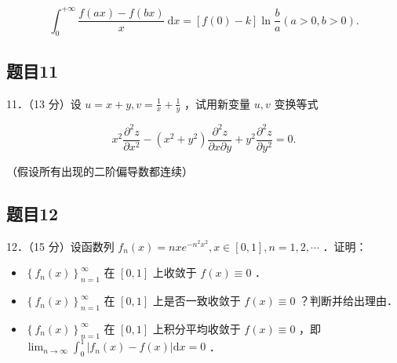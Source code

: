 \documentclass{article}
\begin{document}
\[
\int_{0}^{+\infty} \frac{f(a x)-f(b x)}{x} \mathrm{~d} x=[f(0)-k] \ln \frac{b}{a}(a>0, b>0) .
\]

\subsection{题目11}
11．（13 分）设 \(u=x+y, v=\frac{1}{x}+\frac{1}{y}\) ，试用新变量 \(u, v\) 变换等式

\[
x^{2} \frac{\partial^{2} z}{\partial x^{2}}-\left(x^{2}+y^{2}\right) \frac{\partial^{2} z}{\partial x \partial y}+y^{2} \frac{\partial^{2} z}{\partial y^{2}}=0 .
\]

（假设所有出现的二阶偏导数都连续）\\

\subsection{题目12}
12．（15 分）设函数列 \(f_{n}(x)=n x e^{-n^{2} x^{2}}, x \in[0,1], n=1,2, \cdots\) ．证明：

\begin{itemize}
  \item[（1）] \(\left\{f_{n}(x)\right\}_{n=1}^{\infty}\) 在 \([0,1]\) 上收敛于 \(f(x) \equiv 0\) ．
  \item[（2）] \(\left\{f_{n}(x)\right\}_{n=1}^{\infty}\) 在 \([0,1]\) 上是否一致收敛于 \(f(x) \equiv 0\) ？判断并给出理由．
  \item[（3）] \(\left\{f_{n}(x)\right\}_{n=1}^{\infty}\) 在 \([0,1]\) 上积分平均收敛于 \(f(x) \equiv 0\) ，即 \(\lim _{n \rightarrow \infty} \int_{0}^{1}\left|f_{n}(x)-f(x)\right| \mathrm{d} x=0\) ．
\end{itemize}
\end{document}
